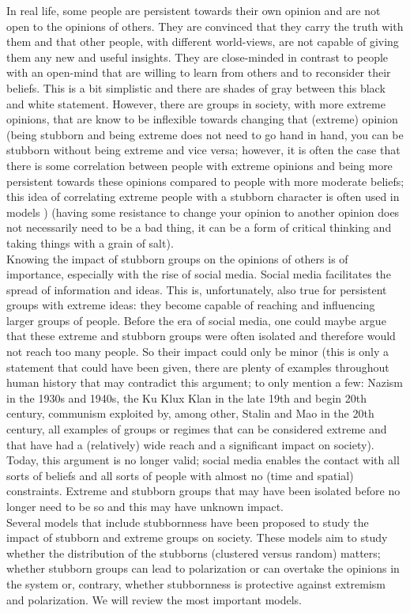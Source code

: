 \documentclass[11 pt , letterpaper , twoside , openright]{book}
\begin{document}
In real life, some people are persistent towards their own opinion and are not open to the opinions of others. They are convinced that they carry the truth with them and that other people, with different world-views, are not capable of giving them any new and useful insights. They are close-minded in contrast to people with an open-mind that are willing to learn from others and to reconsider their beliefs. This is a bit simplistic and there are shades of gray between this black and white statement. However, there are groups in society, with more extreme opinions, that are know to be inflexible towards changing that (extreme) opinion (being stubborn and being extreme does not need to go hand in hand, you can be stubborn without being extreme and vice versa; however, it is often the case that there is some correlation between people with extreme opinions and being more persistent towards these opinions compared to people with more moderate beliefs; this idea of correlating extreme people with a stubborn character is often used in models \cite{Deffuant2006}\cite{Deffuant2002}\cite{Turner}) (having some resistance to change your opinion to another opinion does not necessarily need to be a bad thing, it can be a form of critical thinking and taking things with a grain of salt).\\ 
\newline
Knowing the impact of stubborn groups on the opinions of others is of importance, especially with the rise of social media. Social media facilitates the spread of information and ideas. This is, unfortunately, also true for persistent groups with extreme ideas: they become capable of reaching and influencing larger groups of people. Before the era of social media, one could maybe argue that these extreme and stubborn groups were often isolated and therefore would not reach too many people. So their impact could only be minor (this is only a statement that could have been given, there are plenty of examples throughout human history that may contradict this argument; to only mention a few: Nazism in the 1930s and 1940s, the Ku Klux Klan in the late 19th and begin 20th century, communism exploited by, among other, Stalin and Mao in the 20th century, all examples of groups or regimes that can be considered extreme and that have had a (relatively) wide reach and a significant impact on society). Today, this argument is no longer valid; social media enables the contact with all sorts of beliefs and all sorts of people with almost no (time and spatial) constraints. Extreme and stubborn groups that may have been isolated before no longer need to be so and this may have unknown impact. \\
\newline
Several models that include stubbornness have been proposed to study the impact of stubborn and extreme groups on society. These models aim to study whether the distribution of the stubborns (clustered versus random) matters; whether stubborn groups can lead to polarization or can overtake the opinions in the system or, contrary, whether stubbornness is protective against extremism and polarization. We will review the most important models.
\end{document}
